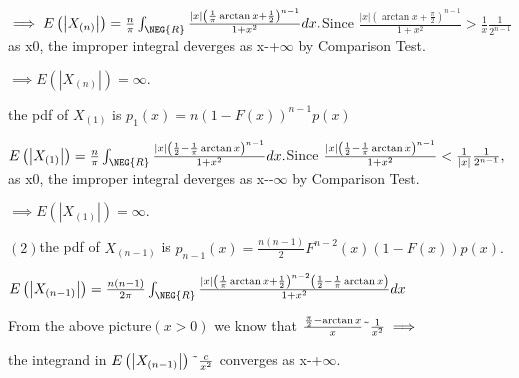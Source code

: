 \documentclass{article}
\begin{document}
$\implies E\left( \left\vert X_{\left( n\right) }\right\vert \right) =\frac{n%
}{\pi }\int_{\NEG{R}}\frac{\left\vert x\right\vert \left( \frac{1}{\pi }%
\arctan x+\frac{1}{2}\right) ^{n-1}}{1+x^{2}}dx.$Since $\frac{\left\vert
x\right\vert \left( \arctan x+\frac{\pi }{2}\right) ^{n-1}}{1+x^{2}}>\frac{1%
}{x}\frac{1}{2^{n-1}}$as x\TEXTsymbol{>}0, the improper integral deverges as
x-\TEXTsymbol{>}+$\infty $ by Comparison Test.

$\implies E\left( \left\vert X_{\left( n\right) }\right\vert \right) =\infty
.$

the pdf of $X_{\left( 1\right) }$ is $p_{1}\left( x\right) =n\left(
1-F\left( x\right) \right) ^{n-1}p\left( x\right) $

$E\left( \left\vert X_{\left( 1\right) }\right\vert \right) =\frac{n}{\pi }%
\int_{\NEG{R}}\frac{\left\vert x\right\vert \left( \frac{1}{2}-\frac{1}{\pi }%
\arctan x\right) ^{n-1}}{1+x^{2}}dx.$Since $\frac{\left\vert x\right\vert
\left( \frac{1}{2}-\frac{1}{\pi }\arctan x\right) ^{n-1}}{1+x^{2}}<\frac{1}{%
\left\vert x\right\vert }\frac{1}{2^{n-1}},$as x\TEXTsymbol{<}0, the
improper integral deverges as x-\TEXTsymbol{>}-$\infty $ by Comparison Test.

$\implies E\left( \left\vert X_{\left( 1\right) }\right\vert \right) =\infty
.$

$\left( 2\right) $the pdf of $X_{\left( n-1\right) }$ is $p_{n-1}\left(
x\right) =\frac{n\left( n-1\right) }{2}F^{n-2}\left( x\right) \left(
1-F\left( x\right) \right) p\left( x\right) .$

$E\left( \left\vert X_{\left( n-1\right) }\right\vert \right) =\frac{n\left(
n-1\right) }{2\pi }\int_{\NEG{R}}\frac{\left\vert x\right\vert \left( \frac{1%
}{\pi }\arctan x+\frac{1}{2}\right) ^{n-2}\left( \frac{1}{2}-\frac{1}{\pi }%
\arctan x\right) }{1+x^{2}}dx$


From the above picture$\left( x>0\right) $ we know that $\frac{\frac{\pi }{2}%
-\arctan x}{x}\symbol{126}\frac{1}{x^{2}}\implies $

the integrand in $E\left( \left\vert X_{\left( n-1\right) }\right\vert
\right) \symbol{126}\frac{c}{x^{2}}$ converges as x-\TEXTsymbol{>}+$\infty .$
\end{document}

